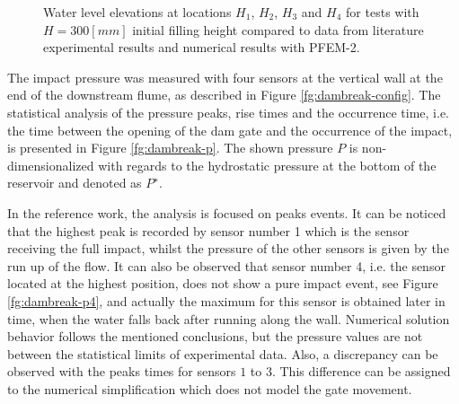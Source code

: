 \documentclass[a4paper,conference]{IEEEtran}
\begin{document}
\begin{figure}[h]
{    }
   \caption{Water level elevations at locations $H_1$, $H_2$, $H_3$ and $H_4$ for tests with $H=300[mm]$ initial filling height compared to data from literature experimental results\cite{Lobovsky13} and numerical results with PFEM-2.}
   \label{fg:dambreak-h}                %
\end{figure}

The impact pressure was measured with four sensors at the vertical wall at the end of the downstream flume, as described in Figure \ref{fg:dambreak-config}. The statistical analysis of the pressure peaks, rise times and the occurrence time, i.e. the time between
the opening of the dam gate and the occurrence of the impact, is presented in Figure \ref{fg:dambreak-p}. The shown pressure $P$ is non-dimensionalized with regards to the hydrostatic pressure at the bottom of the reservoir and denoted as $P^∗$. 

In the reference work, the analysis is focused on peaks events. It can be noticed that the highest peak is recorded by sensor number 1 which is the sensor receiving the full impact, whilst the pressure of the other sensors is given by the run up of the flow. It can also be observed that sensor number 4, i.e. the sensor located at the highest position, does not show a pure impact event, see Figure \ref{fg:dambreak-p4}, and actually the maximum for this sensor is obtained later in time, when the water falls back after running along the wall. Numerical solution behavior follows the mentioned conclusions, but the pressure values are not between the statistical limits of experimental data. Also, a discrepancy can be observed with the peaks times for sensors $1$ to $3$. This difference can be assigned to the numerical simplification which does not model the gate movement.
\end{document}
